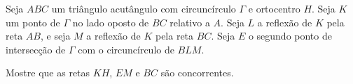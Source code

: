 Seja $ABC$ um triângulo acutângulo com circuncírculo $\Gamma$ e ortocentro $H$. Seja $K$ um ponto de $\Gamma$ no lado oposto de $BC$ relativo a $A$. Seja $L$ a reflexão de $K$ pela reta $AB$, e seja $M$ a reflexão de $K$ pela reta $BC$. Seja $E$ o segundo ponto de intersecção de $\Gamma$ com o circuncírculo de $BLM$.

Mostre que as retas $KH$, $EM$ e $BC$ são concorrentes.
